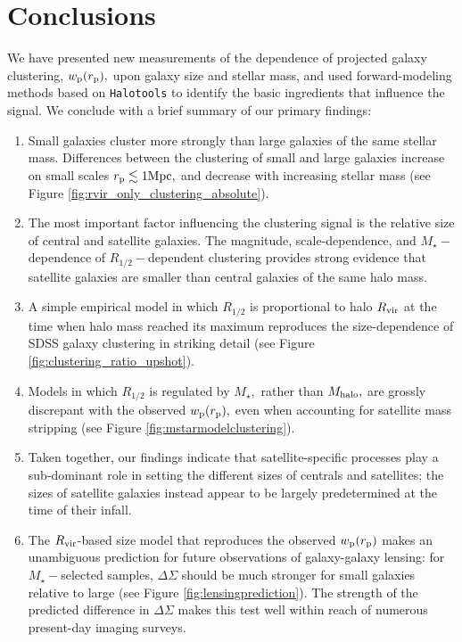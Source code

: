 \documentclass[usenatbib,usegraphicx,letterpaper]{mn2e}
\newcommand{\ben}{\begin{enumerate}}
\newcommand{\een}{\end{enumerate}}
\newcommand{\rhalf}{R_{1/2}}
\newcommand{\mstar}{M_{\star}}
\newcommand{\mhalo}{M_{\rm halo}}
\newcommand{\rvir}{R_{\rm vir}}
\newcommand{\rproj}{r_{\rm p}}
\newcommand{\wproj}{w_{\rm p}}
\newcommand{\mpc}{{\rm Mpc}}
\begin{document}
\section{Conclusions}
\label{sec:conclusion}

We have presented new measurements of the dependence of projected galaxy clustering, $\wproj(\rproj),$ upon galaxy size and stellar mass, and used forward-modeling methods based on {\tt Halotools} to identify the basic ingredients that influence the signal. We conclude with a brief summary of our primary findings:

\ben
\item Small galaxies cluster more strongly than large galaxies of the same stellar mass. Differences between the clustering of small and large galaxies increase on small scales $\rproj\lesssim1\mpc,$ and decrease with increasing stellar mass (see Figure \ref{fig:rvir_only_clustering_absolute}).
\item The most important factor influencing the clustering signal is the relative size of central and satellite galaxies. The magnitude, scale-dependence, and $\mstar-$dependence of $\rhalf-$dependent clustering provides strong evidence that satellite galaxies are smaller than central galaxies of the same halo mass.
\item A simple empirical model in which $\rhalf$ is proportional to halo $\rvir$ at the time when halo mass reached its maximum reproduces the size-dependence of SDSS galaxy clustering in striking detail (see Figure \ref{fig:clustering_ratio_upshot}).
\item Models in which $\rhalf$ is regulated by $\mstar,$ rather than $\mhalo,$ are grossly discrepant with the observed $\wproj(\rproj),$ even when accounting for satellite mass stripping (see Figure \ref{fig:mstarmodelclustering}).
\item Taken together, our findings indicate that satellite-specific processes play a sub-dominant role in setting the different sizes of centrals and satellites; the sizes of satellite galaxies instead appear to be largely predetermined at the time of their infall.
\item The $\rvir$-based size model that reproduces the observed $\wproj(\rproj)$ makes an unambiguous  prediction for future observations of galaxy-galaxy lensing: for $\mstar-$selected samples, $\Delta\Sigma$ should be much stronger for small galaxies relative to large (see Figure \ref{fig:lensingprediction}). The strength of the predicted difference in $\Delta\Sigma$ makes this test well within reach of numerous present-day imaging surveys.
\een
\end{document}

